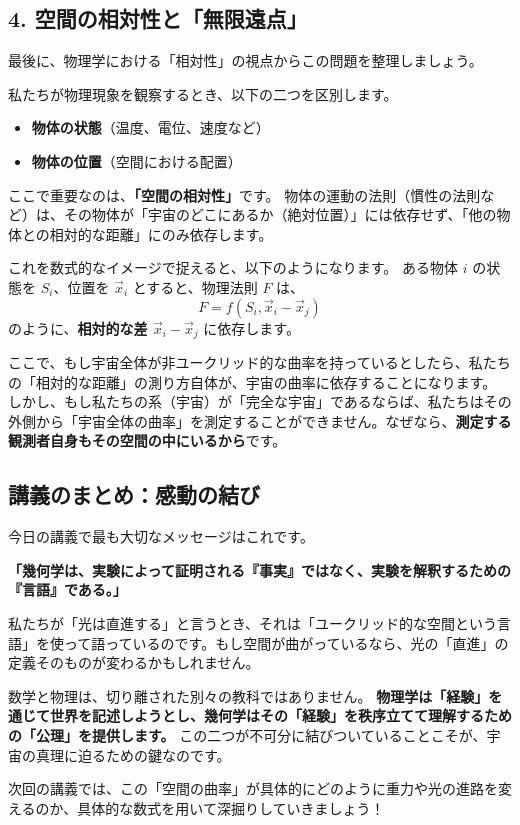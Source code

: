 \documentclass[a4paper,11pt,openany]{ltjsbook}
\begin{document}
\begin{lecturebox}
\subsection*{4. 空間の相対性と「無限遠点」}

最後に、物理学における「相対性」の視点からこの問題を整理しましょう。

私たちが物理現象を観察するとき、以下の二つを区別します。
\begin{itemize}[leftmargin=2em]
\item \textbf{物体の状態}（温度、電位、速度など）
\item \textbf{物体の位置}（空間における配置）
\end{itemize}

ここで重要なのは、\textbf{「空間の相対性」}です。
物体の運動の法則（慣性の法則など）は、その物体が「宇宙のどこにあるか（絶対位置）」には依存せず、「他の物体との相対的な距離」にのみ依存します。

これを数式的なイメージで捉えると、以下のようになります。
ある物体 $i$ の状態を $S_i$、位置を $\vec{x}_i$ とすると、物理法則 $F$ は、
$$ F = f(S_i, \vec{x}_i - \vec{x}_j) $$
のように、\textbf{相対的な差 $\vec{x}_i - \vec{x}_j$} に依存します。

ここで、もし宇宙全体が非ユークリッド的な曲率を持っているとしたら、私たちの「相対的な距離」の測り方自体が、宇宙の曲率に依存することになります。
しかし、もし私たちの系（宇宙）が「完全な宇宙」であるならば、私たちはその外側から「宇宙全体の曲率」を測定することができません。なぜなら、\textbf{測定する観測者自身もその空間の中にいるから}です。

\subsection*{講義のまとめ：感動の結び}

今日の講義で最も大切なメッセージはこれです。

\textbf{「幾何学は、実験によって証明される『事実』ではなく、実験を解釈するための『言語』である。」}

私たちが「光は直進する」と言うとき、それは「ユークリッド的な空間という言語」を使って語っているのです。もし空間が曲がっているなら、光の「直進」の定義そのものが変わるかもしれません。

数学と物理は、切り離された別々の教科ではありません。
\textbf{物理学は「経験」を通じて世界を記述しようとし、幾何学はその「経験」を秩序立てて理解するための「公理」を提供します。}
この二つが不可分に結びついていることこそが、宇宙の真理に迫るための鍵なのです。

次回の講義では、この「空間の曲率」が具体的にどのように重力や光の進路を変えるのか、具体的な数式を用いて深掘りしていきましょう！
\end{lecturebox}
\end{document}
